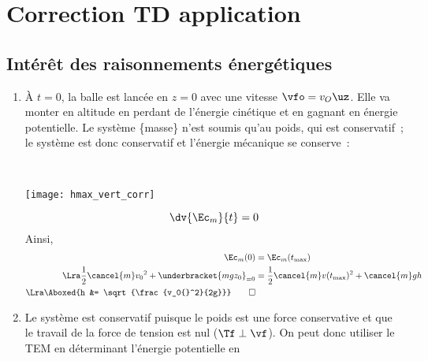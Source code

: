 \documentclass[a4paper, 12pt, final, garamond]{book}
\begin{document}
\setcounter{chapter}{3}

\chapter{Correction TD application}
\section{Intérêt des raisonnements énergétiques}

\begin{enumerate}
    \item
        \begin{minipage}[t]{0.48\linewidth}
            À $t=0$, la balle est lancée en $z = 0$ avec une vitesse $\vfo =
            v_O\uz$. Elle va monter en altitude en perdant de l'énergie cinétique et
            en gagnant en énergie potentielle. \bigbreak
            Le système \{masse\} n'est soumis qu'au poids, qui est conservatif~; le
            système est donc conservatif et l'énergie mécanique se conserve~:
        \end{minipage}
        \hfill
        \begin{minipage}[t]{0.50\linewidth}
            ~
            \begin{center}
                \texttt{[image: hmax\_vert\_corr]}
                \label{fig:penduleztt}
            \end{center}
        \end{minipage} \bigbreak
        \[\dv{\Ec_m}{t} = 0\]
        Ainsi,\vspace*{-24pt}
        \begin{align*}
            \Ec_m(0) &= \Ec_m(t_{\max})
            \\\Lra
            \frac{1}{2}\cancel{m}v_0{}^2 + \underbracket{mgz_0}_{=0}
                     &=
            \frac{1}{2}\cancel{m}v(t_{\max})^2 + \cancel{m}gh
            \\\Lra
            \Aboxed{h &= \sqrt{\frac{v_0{}^2}{2g}}}
            \qed
        \end{align*}
    \item
        \begin{minipage}[t]{0.70\linewidth}
            Le système est conservatif puisque le poids est une force conservative
            et que le travail de la force de tension est nul ($\Tf \perp \vf$). On
            peut donc utiliser le TEM en déterminant l'énergie potentielle en

\end{minipage}
\end{enumerate}
\end{document}
